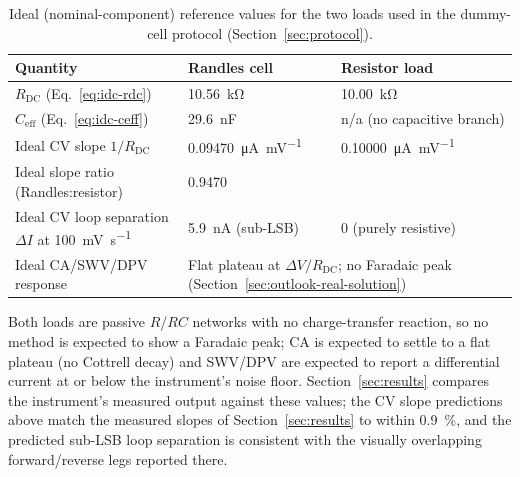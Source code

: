 \begin{table}[h]
\centering
\footnotesize
\setlength{\tabcolsep}{4pt}
\caption{Ideal (nominal-component) reference values for the two loads used
in the dummy-cell protocol (Section~\ref{sec:protocol}).}
\label{tab:ideal}
\begin{threeparttable}
\begin{tabular}{@{}p{4.0cm}p{1.9cm}p{1.9cm}@{}}
\toprule
Quantity & Randles cell & Resistor load \\
\midrule
$R_{\mathrm{DC}}$ (Eq.~\ref{eq:idc-rdc}) & \SI{10.56}{\kilo\ohm} & \SI{10.00}{\kilo\ohm} \\
$C_{\mathrm{eff}}$ (Eq.~\ref{eq:idc-ceff}) & \SI{29.6}{\nano\farad} & n/a (no capacitive branch) \\
Ideal CV slope $1/R_{\mathrm{DC}}$ & \SI{0.09470}{\micro\ampere\per\milli\volt} & \SI{0.10000}{\micro\ampere\per\milli\volt} \\
Ideal slope ratio (Randles:resistor) & \multicolumn{2}{p{4.1cm}}{0.9470} \\
Ideal CV loop separation $\Delta I$ at \SI{100}{\milli\volt\per\second} & \SI{5.9}{\nano\ampere} (sub-LSB) & 0 (purely resistive) \\
Ideal CA/SWV/DPV response & \multicolumn{2}{p{4.1cm}}{Flat plateau at $\Delta V/R_{\mathrm{DC}}$; no Faradaic peak (Section~\ref{sec:outlook-real-solution})} \\
\bottomrule
\end{tabular}
\begin{tablenotes}\footnotesize
\item Both loads are passive $R$/$RC$ networks with no charge-transfer
  reaction, so no method is expected to show a Faradaic peak; CA is
  expected to settle to a flat plateau (no Cottrell decay) and SWV/DPV are
  expected to report a differential current at or below the instrument's
  noise floor. Section~\ref{sec:results} compares the instrument's measured
  output against these values; the CV slope predictions above match the
  measured slopes of Section~\ref{sec:results} to within
  \SI{0.9}{\percent}, and the predicted sub-LSB loop separation is
  consistent with the visually overlapping forward/reverse legs reported
  there.
\end{tablenotes}
\end{threeparttable}
\end{table}
